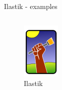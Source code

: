 \documentclass{beamer}
\begin{document}
\begin{frame}{Ilastik - examples}
\begin{columns}[T]
\begin{column}{.2\textwidth}
\begin{figure}[!ht]
\includegraphics[width=\textwidth]{Ilastik.png}
\caption{Ilastik}
\label{}
\end{figure}
\end{column}%
\end{columns}
\end{frame}
\end{document}
